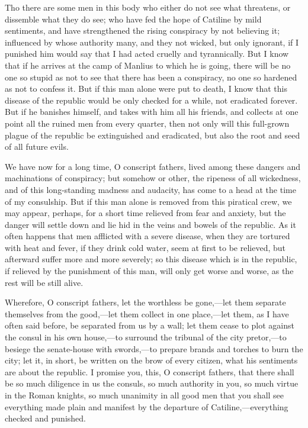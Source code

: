 \documentclass[a4paper]{amsbook}
\begin{document}
Tho there are some men in this body who either do not see what threatens, or dissemble what they do see; who have fed the hope of Catiline by mild sentiments, and have strengthened the rising conspiracy by not believing it; influenced by whose authority many, and they not wicked, but only ignorant, if I punished him would say that I had acted cruelly and tyrannically. But I know that if he arrives at the camp of Manlius to which he is going, there will be no one so stupid as not to see that there has been a conspiracy, no one so hardened as not to confess it. But if this man alone were put to death, I know that this disease of the republic would be only checked for a while, not eradicated forever. But if he banishes himself, and takes with him all his friends, and collects at one point all the ruined men from every quarter, then not only will this full-grown plague of the republic be extinguished and eradicated, but also the root and seed of all future evils.

We have now for a long time, O conscript fathers, lived among these dangers and machinations of conspiracy; but somehow or other, the ripeness of all wickedness, and of this long-standing madness and audacity, has come to a head at the time of my consulship. But if this man alone is removed from this piratical crew, we may appear, perhaps, for a short time relieved from fear and anxiety, but the danger will settle down and lie hid in the veins and bowels of the republic. As it often happens that men afflicted with a severe disease, when they are tortured with heat and fever, if they drink cold water, seem at first to be relieved, but afterward suffer more and more severely; so this disease which is in the republic, if relieved by the punishment of this man, will only get worse and worse, as the rest will be still alive.

Wherefore, O conscript fathers, let the worthless be gone,—let them separate themselves from the good,—let them collect in one place,—let them, as I have often said before, be separated from us by a wall; let them cease to plot against the consul in his own house,—to surround the tribunal of the city pretor,—to besiege the senate-house with swords,—to prepare brands and torches to burn the city; let it, in short, be written on the brow of every citizen, what his sentiments are about the republic. I promise you, this, O conscript fathers, that there shall be so much diligence in us the consuls, so much authority in you, so much virtue in the Roman knights, so much unanimity in all good men that you shall see everything made plain and manifest by the departure of Catiline,—everything checked and punished.
\end{document}
